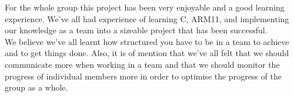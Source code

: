 For the whole group this project has been very enjoyable and a good learning experience. We've all had experience of learning C, ARM11, and implementing our knowledge as a team into a sizeable project that has been successful. 
~\\

We believe we've all learnt how structured you have to be in a team to achieve and to get things done. Also, it is of mention that we've all felt that we should communicate more when working in a team and that we should monitor the progress of individual members more in order to optimise the progress of the group as a whole.
